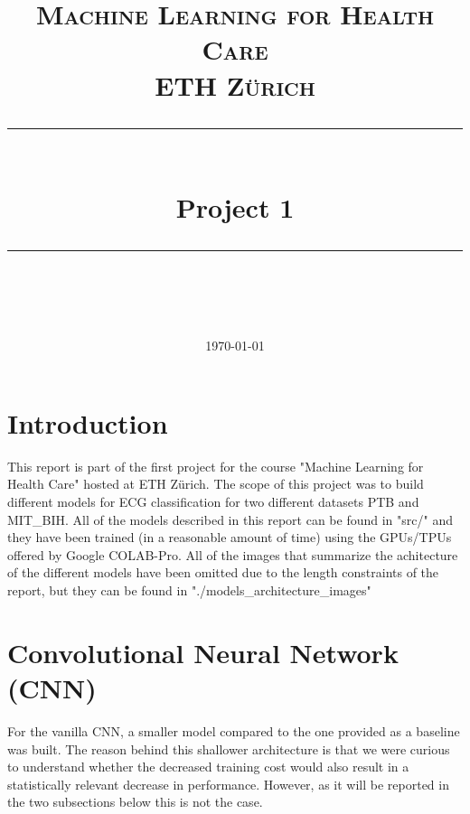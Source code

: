 \documentclass[11pt]{scrartcl}
\title{	
	\normalfont\normalsize
	\textsc{Machine Learning for Health Care\\%
	ETH Zürich}\\
	\vspace{25pt}
	\rule{\linewidth}{0.5pt}\\
	\vspace{20pt}
	{\huge Project 1}\\
	\vspace{12pt}
	\rule{\linewidth}{1pt}\\
	\vspace{12pt}
}
\author{\LARGE \thestudent}
\date{\normalsize\today}
\begin{document}
\maketitle
\newpage
\tableofcontents
\newpage



\section{Introduction}
This report is part of the first project for the course "Machine Learning for Health Care" hosted at ETH Zürich. The scope of this project was to build different models for ECG classification for two different datasets PTB and MIT\_BIH.  All of the models described in this report can be found in  "src/" and they have been trained (in a reasonable amount of time) using the GPUs/TPUs offered by Google COLAB-Pro. All of the images that summarize the achitecture of the different models have been omitted due to the length constraints of the report, but they can be found in "./models\_architecture\_images"


\section{Convolutional Neural Network (CNN)}
For the vanilla CNN, a smaller model compared to the one provided as a baseline was built. The reason behind this shallower architecture is that we were curious to understand whether the decreased training cost would also result in a statistically relevant decrease in performance. However, as it will be reported in the two subsections below this is not the case. 

\end{document}
